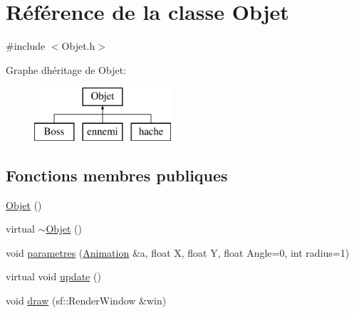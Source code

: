 \hypertarget{class_objet}{}\section{Référence de la classe Objet}
\label{class_objet}


{\ttfamily \#include $<$Objet.\+h$>$}

Graphe d\textquotesingle{}héritage de Objet\+:\begin{figure}[H]
\begin{center}
\leavevmode
\includegraphics[height=2.000000cm]{class_objet}
\end{center}
\end{figure}
\subsection*{Fonctions membres publiques}
\begin{DoxyCompactItemize}
\item 
\hyperlink{class_objet_aefdd826d50085897e4894ffef4597d04}{Objet} ()
\item 
virtual \hyperlink{class_objet_a77a195bb1452ef4221b5080632cd7757}{$\sim$\+Objet} ()
\item 
void \hyperlink{class_objet_ad4b867d62bf9b79a23d6017cc36b6641}{parametres} (\hyperlink{class_animation}{Animation} \&a, float X, float Y, float Angle=0, int radius=1)
\item 
virtual void \hyperlink{class_objet_a684611b20eb6e6df5e4743dd3e42385a}{update} ()
\item 
void \hyperlink{class_objet_a9d1d8178549d070d7c40635efae24b5e}{draw} (sf\+::\+Render\+Window \&win)
\end{DoxyCompactItemize}
